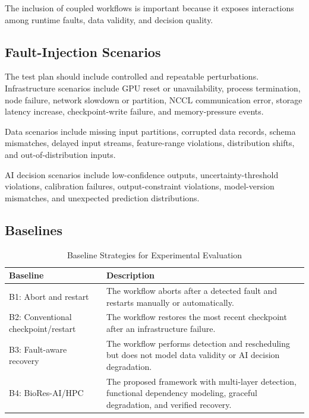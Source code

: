 \documentclass[conference]{IEEEtran}
\begin{document}
The inclusion of coupled workflows is important because it exposes interactions among runtime faults, data validity, and decision quality.

\subsection{Fault-Injection Scenarios}

The test plan should include controlled and repeatable perturbations. Infrastructure scenarios include GPU reset or unavailability, process termination, node failure, network slowdown or partition, NCCL communication error, storage latency increase, checkpoint-write failure, and memory-pressure events.

Data scenarios include missing input partitions, corrupted data records, schema mismatches, delayed input streams, feature-range violations, distribution shifts, and out-of-distribution inputs.

AI decision scenarios include low-confidence outputs, uncertainty-threshold violations, calibration failures, output-constraint violations, model-version mismatches, and unexpected prediction distributions.

\subsection{Baselines}

\begin{table}[t]
\caption{Baseline Strategies for Experimental Evaluation}
\label{tab:baselines}
\centering
\begin{tabular}{p{} p{}}
\toprule
\textbf{Baseline} & \textbf{Description} \\
\midrule
B1: Abort and restart & The workflow aborts after a detected fault and restarts manually or automatically. \\
B2: Conventional checkpoint/restart & The workflow restores the most recent checkpoint after an infrastructure failure. \\
B3: Fault-aware recovery & The workflow performs detection and rescheduling but does not model data validity or AI decision degradation. \\
B4: BioRes-AI/HPC & The proposed framework with multi-layer detection, functional dependency modeling, graceful degradation, and verified recovery. \\
\bottomrule
\end{tabular}
\end{table}
\end{document}

